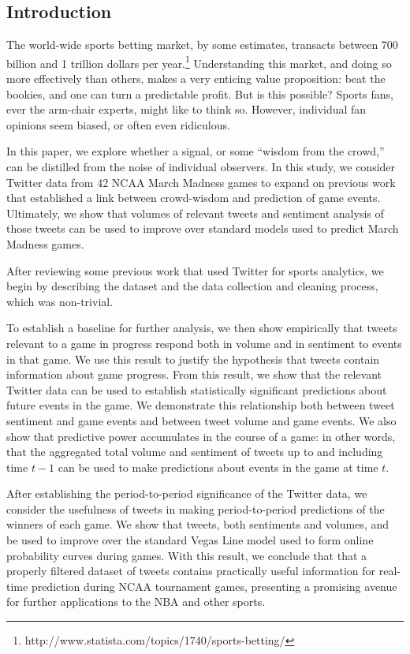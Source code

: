 \documentclass[12pt]{article}
\begin{document}
\tableofcontents
\newpage
\begin{doublespacing}

\section{Introduction}

The world-wide sports betting market, by some estimates, transacts 
between 700 billion and 1 trillion dollars per year.\footnote{http://www.statista.com/topics/1740/sports-betting/}
Understanding this market, and doing so more effectively
than others, makes a very enticing value proposition:
beat the bookies, and one can turn a predictable profit. But is this possible? Sports fans,
ever the arm-chair experts, might like to think so.
However, individual fan opinions seem biased, or often even ridiculous.

In this paper, we explore whether a signal, or some ``wisdom from the crowd,'' can be distilled
from the noise of individual observers. In this study,
we consider Twitter data from 42 NCAA March Madness 
games to expand on previous work that established
a link between crowd-wisdom and prediction of game events.
Ultimately, we show that volumes of relevant tweets and sentiment
analysis of those tweets can be used to improve over 
standard models used to predict March Madness games.

After reviewing some previous work that used Twitter for sports analytics,
we begin by describing the dataset and the data collection and cleaning process,
which was non-trivial.

To establish a baseline for further analysis, we then show
empirically that tweets relevant to a game in progress
respond both in volume and in sentiment to events in
that game. We use this result to justify the hypothesis that 
tweets contain information about game progress. From this
result, we show that the relevant Twitter data can be 
used to establish statistically significant predictions
about future events in the game. We demonstrate this 
relationship both between tweet sentiment and game
events and between tweet volume and game events. We also
show that predictive power accumulates in the course 
of a game: in other words, that the aggregated total 
volume and sentiment of tweets up to and including time $t - 1$
can be used to make predictions about events in the game
at time $t$. 

After establishing the period-to-period significance
of the Twitter data, we consider the usefulness
of tweets in making period-to-period predictions
of the winners of each game. We show that tweets,
both sentiments and volumes, and be used to 
improve over the standard Vegas Line model
used to form online probability curves during
games. With this result, we conclude that that
a properly filtered dataset of tweets 
contains practically useful information
for real-time prediction during NCAA tournament
games, presenting a promising avenue for further
applications to the NBA and other sports. 





\end{doublespacing}
\end{document}
